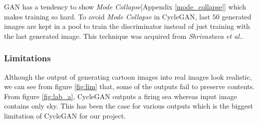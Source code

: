 GAN has a tendency to show \textit{Mode Collapse}[Appendix \ref{mode_collapse}] which makes training so hard. To avoid \textit{Mode Collapse} in CycleGAN\cite{cyclegan}, last $50$ generated images are kept in a pool to train the discriminator instead of just training with the last generated image. This technique was acquired from \textit{Shrivastava et al.}\cite{DBLP:conf/cvpr/ShrivastavaPTSW17}.
\subsubsection{Limitations}

Although the output of generating cartoon images into real images look realistic, we can see from figure \ref{fig:lim} that, some of the outputs fail to preserve contents. From figure \ref{fig:lab_a}, CycleGAN\cite{cyclegan} outputs a firing sea whereas input image contains only sky. This has been the case for various outputs which is the biggest limitation of CycleGAN\cite{cyclegan} for our project.
